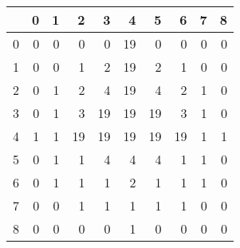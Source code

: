 \UseRawInputEncoding
\begin{tabular}{lrrrrrrrrr}
\toprule
{} &  0 &  1 &  2 &  3 &  4 &  5 &  6 &  7 &  8 \\
\midrule
0 &  0 &  0 &  0 &  0 & 19 &  0 &  0 &  0 &  0 \\
1 &  0 &  0 &  1 &  2 & 19 &  2 &  1 &  0 &  0 \\
2 &  0 &  1 &  2 &  4 & 19 &  4 &  2 &  1 &  0 \\
3 &  0 &  1 &  3 & 19 & 19 & 19 &  3 &  1 &  0 \\
4 &  1 &  1 & 19 & 19 & 19 & 19 & 19 &  1 &  1 \\
5 &  0 &  1 &  1 &  4 &  4 &  4 &  1 &  1 &  0 \\
6 &  0 &  1 &  1 &  1 &  2 &  1 &  1 &  1 &  0 \\
7 &  0 &  0 &  1 &  1 &  1 &  1 &  1 &  0 &  0 \\
8 &  0 &  0 &  0 &  0 &  1 &  0 &  0 &  0 &  0 \\
\bottomrule
\end{tabular}
